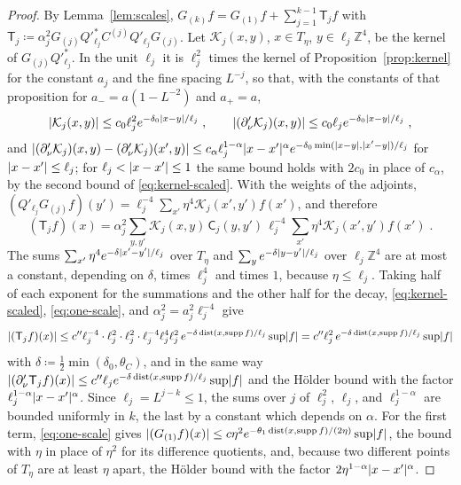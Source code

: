 \documentclass[11pt]{preprint}
\newcommand{\dist}{\operatorname{dist}}
\DeclarePairedDelimiter{\abs}{\lvert}{\rvert}
\numberwithin{equation}{section}
\theoremstyle{definition}
\theoremstyle{remark}
\theoremstyle{plain}
\begin{document}
\begin{proof}
By Lemma~\ref{lem:scales}, $G_{(k)}f = G_{(1)}f + \sum_{j=1}^{k-1}\mathsf T_jf$ with $\mathsf T_j \coloneqq \alpha_j^2G_{(j)}Q'^*_{\ell_j}C^{(j)}Q'_{\ell_j}G_{(j)}$. Let $\mathcal K_j(x, y)$, $x \in T_\eta$, $y \in \ell_j\mathbb Z^4$, be the kernel of $G_{(j)}Q'^*_{\ell_j}$. In the unit $\ell_j$ it is $\ell_j^2$ times the kernel of Proposition~\ref{prop:kernel} for the constant $a_j$ and the fine spacing $L^{-j}$, so that, with the constants of that proposition for $a_- = a(1 - L^{-2})$ and $a_+ = a$,
\begin{equation}\label{eq:kernel-scaled}
    \abs{\mathcal K_j(x, y)} \leq c_0\ell_j^2e^{-\delta_0\abs{x - y}/\ell_j}\;,
    \qquad
    \abs{(\partial'_\nu\mathcal K_j)(x, y)} \leq c_0\ell_je^{-\delta_0\abs{x - y}/\ell_j}\;,
\end{equation}
and $\abs{(\partial'_\nu\mathcal K_j)(x, y) - (\partial'_\nu\mathcal K_j)(x', y)} \leq c_\alpha\ell_j^{1-\alpha}\abs{x - x'}^\alpha e^{-\delta_0\min(\abs{x - y}, \abs{x' - y})/\ell_j}$ for $\abs{x - x'} \leq \ell_j$; for $\ell_j < \abs{x - x'} \leq 1$ the same bound holds with $2c_0$ in place of $c_\alpha$, by the second bound of \eqref{eq:kernel-scaled}. With the weights of the adjoints, $(Q'_{\ell_j}G_{(j)}f)(y') = \ell_j^{-4}\sum_{x'}\eta^4\mathcal K_j(x', y')f(x')$, and therefore
\begin{equation}\label{eq:scale-term}
    (\mathsf T_jf)(x) = \alpha_j^2\sum_{y,y'}\mathcal K_j(x, y)\,\mathsf C_j(y, y')\,\ell_j^{-4}\sum_{x'}\eta^4\mathcal K_j(x', y')f(x')\;.
\end{equation}
The sums $\sum_{x'}\eta^4e^{-\delta\abs{x' - y'}/\ell_j}$ over $T_\eta$ and $\sum_{y}e^{-\delta\abs{y - y'}/\ell_j}$ over $\ell_j\mathbb Z^4$ are at most a constant, depending on $\delta$, times $\ell_j^4$ and times $1$, because $\eta \leq \ell_j$. Taking half of each exponent for the summations and the other half for the decay, \eqref{eq:kernel-scaled}, \eqref{eq:one-scale}, and $\alpha_j^2 = a_j^2\ell_j^{-4}$ give
\begin{equation}\label{eq:scale-term-bound}
    \abs{(\mathsf T_jf)(x)} \leq c''\ell_j^{-4} \cdot \ell_j^2 \cdot \ell_j^2 \cdot \ell_j^{-4}\ell_j^4\ell_j^2\,e^{-\delta\dist(x, \operatorname{supp}f)/\ell_j}\sup\abs f = c''\ell_j^2\,e^{-\delta\dist(x, \operatorname{supp}f)/\ell_j}\sup\abs f
\end{equation}
with $\delta \coloneqq \frac12\min(\delta_0, \theta_C)$, and in the same way $\abs{(\partial'_\nu\mathsf T_jf)(x)} \leq c''\ell_je^{-\delta\dist(x, \operatorname{supp}f)/\ell_j}\sup\abs f$ and the H\"older bound with the factor $\ell_j^{1-\alpha}\abs{x - x'}^\alpha$. Since $\ell_j = L^{j-k} \leq 1$, the sums over $j$ of $\ell_j^2$, $\ell_j$, and $\ell_j^{1-\alpha}$ are bounded uniformly in $k$, the last by a constant which depends on $\alpha$. For the first term, \eqref{eq:one-scale} gives $\abs{(G_{(1)}f)(x)} \leq c\eta^2e^{-\theta_1\dist(x, \operatorname{supp}f)/(2\eta)}\sup\abs f$, the bound with $\eta$ in place of $\eta^2$ for its difference quotients, and, because two different points of $T_\eta$ are at least $\eta$ apart, the H\"older bound with the factor $2\eta^{1-\alpha}\abs{x - x'}^\alpha$.
\end{proof}
\end{document}
